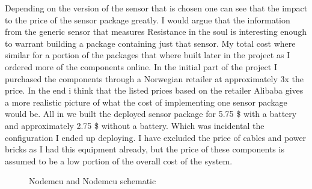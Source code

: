 \documentclass[]{uiophd}
\begin{document}
Depending on the version of the sensor that is chosen one can see that the impact to the price of the sensor package greatly. I would argue that the information from the generic sensor that measures Resistance in the soul is interesting enough to warrant building a package containing just that sensor. My total cost where similar for a portion of the packages that where built later in the project as I ordered more of the components online. In the initial part of the project I purchased the components through a Norwegian retailer at approximately 3x the price. In the end i think that the listed prices based on the retailer Alibaba gives a more realistic picture of what the cost of implementing one sensor package would be. All in we built the deployed sensor package for 5.75 \$ with a battery and approximately 2.75 \$ without a battery. Which was incidental the configuration I ended up deploying. I have excluded the price of cables and power bricks as I had this equipment already, but the price of these components is assumed to be a low portion of the overall cost of the system.


\begin{figure}[h]
\caption{Nodemcu and Nodemcu schematic}%
\centering
    \qquad
    
    \label{fig:example}%
\end{figure}
\end{document}
